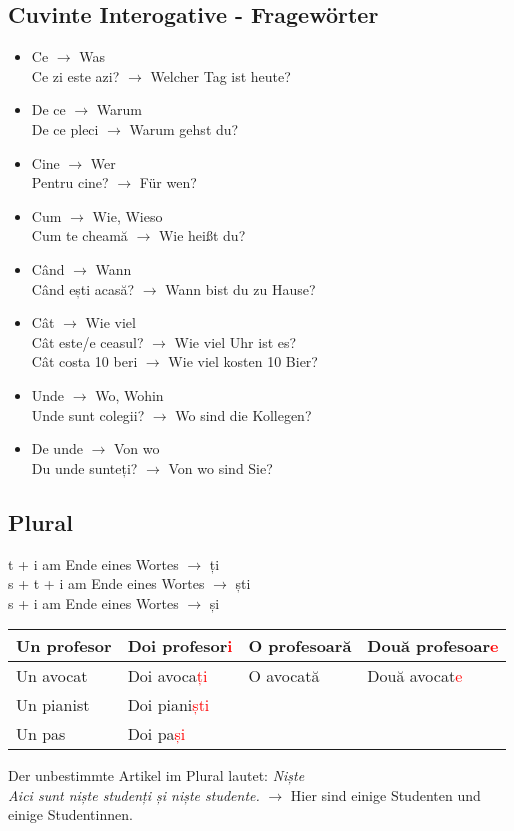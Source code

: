 \documentclass[11pt, oneside]{article}
\begin{document}
\subsection{Cuvinte Interogative - Fragewörter}
\begin{itemize}
  \item Ce $\rightarrow$ Was\\
  Ce zi este azi? $\rightarrow$ Welcher Tag ist heute?
  \item De ce $\rightarrow$ Warum\\
  De ce pleci $\rightarrow$ Warum gehst du?
  \item Cine $\rightarrow$ Wer\\
  Pentru cine? $\rightarrow$ Für wen?
  \item Cum $\rightarrow$ Wie, Wieso\\
  Cum te cheamă $\rightarrow$ Wie heißt du?
  \item Când $\rightarrow$ Wann\\
  Când ești acasă? $\rightarrow$ Wann bist du zu Hause?
  \item Cât $\rightarrow$ Wie viel\\
  Cât este/e ceasul? $\rightarrow$ Wie viel Uhr ist es?\\
  Cât costa 10 beri $\rightarrow$ Wie viel kosten 10 Bier?
  \item Unde $\rightarrow$ Wo, Wohin\\
  Unde sunt colegii? $\rightarrow$ Wo sind die Kollegen?
  \item De unde $\rightarrow$ Von wo\\
  Du unde sunteți? $\rightarrow$ Von wo sind Sie?
\end{itemize}
%
\subsection{Plural}
t + i am Ende eines Wortes $\rightarrow$ ți\\
s + t + i am Ende eines Wortes $\rightarrow$ ști\\
s + i am Ende eines Wortes $\rightarrow$ și\\
\begin{center}
  \begin{tabular}{ |l|l||l|l|  }
      \hline
      Un profesor & Doi profesor\textcolor{Red}{i} & O profesoară & Două profesoar\textcolor{Red}{e}\\
      \hline
      Un avocat & Doi avoca\textcolor{Red}{ți} & O avocată & Două avocat\textcolor{Red}{e}\\
      \hline
      Un pianist & Doi piani\textcolor{Red}{ști} & &\\
      \hline
      Un pas & Doi pa\textcolor{Red}{și} & &\\
      \hline
     \end{tabular}
\end{center}
%
Der unbestimmte Artikel im Plural lautet: \emph{Niște}\\
\newline
\emph{Aici sunt niște studenți și niște studente.} $\rightarrow$
Hier sind einige Studenten und einige Studentinnen.
%
\end{document}
